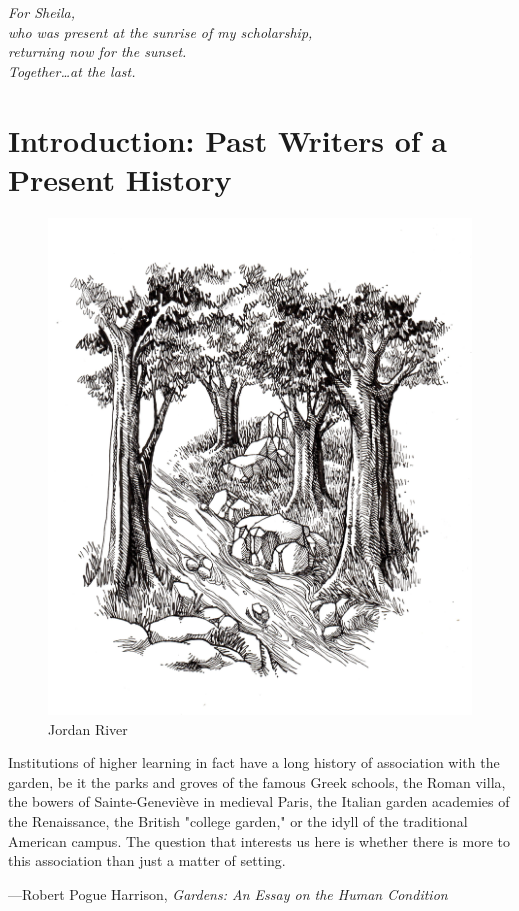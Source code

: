 \documentclass[
  american,
  letterpaper,
]{scrreprt}
\newenvironment{mydedication}
  {\vspace*{\fill}\begin{center}\small\itshape}
  {\end{center}\vspace*{\fill}}
\begin{document}

\begin{mydedication}
For Sheila,\\
who was present at the sunrise of my scholarship,\\
returning now for the sunset.\\
Together\ldots{}at the last.
\end{mydedication}


\chapter*{Introduction: Past Writers of a Present
History}\label{introduction-past-writers-of-a-present-history}


\begin{figure}[H]

{\centering \includegraphics[width=0.6\linewidth,height=\textheight,keepaspectratio]{images/introduction.jpeg}

}

\caption{Jordan River}

\end{figure}%

\epigraph{
Institutions of higher learning in fact have a long history of association with the garden, be it the parks and groves of the famous Greek schools, the Roman villa, the bowers of Sainte-Geneviève in medieval Paris, the Italian garden academies of the Renaissance, the British "college garden," or the idyll of the traditional American campus. The question that interests us here is whether there is more to this association than just a matter of setting. }
{\parbox{.75\textwidth}{\raggedleft---Robert Pogue Harrison, \textit{Gardens: An Essay on the Human Condition}}}
\end{document}
